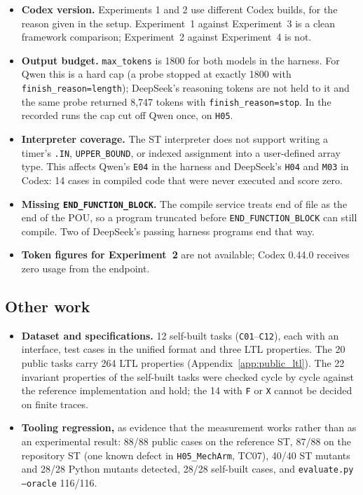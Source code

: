 \begin{itemize}
\item \textbf{Codex version.} Experiments 1 and 2 use different Codex builds,
      for the reason given in the setup. Experiment~1 against Experiment~3 is a
      clean framework comparison; Experiment~2 against Experiment~4 is not.
\item \textbf{Output budget.} \texttt{max\_tokens} is 1800 for both models in
      the harness. For Qwen this is a hard cap (a probe stopped at exactly 1800
      with \texttt{finish\_reason=length}); DeepSeek's reasoning tokens are not
      held to it and the same probe returned 8{,}747 tokens with
      \texttt{finish\_reason=stop}. In the recorded runs the cap cut off Qwen
      once, on \texttt{H05}.
\item \textbf{Interpreter coverage.} The ST interpreter does not support
      writing a timer's \texttt{.IN}, \texttt{UPPER\_BOUND}, or indexed assignment
      into a user-defined array type. This affects Qwen's \texttt{E04} in the
      harness and DeepSeek's \texttt{H04} and \texttt{M03} in Codex: 14 cases
      in compiled code that were never executed and score zero.
\item \textbf{Missing \texttt{END\_FUNCTION\_BLOCK}.} The compile service
      treats end of file as the end of the POU, so a program truncated before
      \texttt{END\_FUNCTION\_BLOCK} can still compile. Two of DeepSeek's passing
      harness programs end that way.
\item \textbf{Token figures for Experiment~2} are not available; Codex 0.44.0
      receives zero usage from the endpoint.
\end{itemize}

\subsection{Other work}

\begin{itemize}
\item \textbf{Dataset and specifications.} 12 self-built tasks
      (\texttt{C01}--\texttt{C12}), each with an interface, test cases in the
      unified format and three LTL properties. The 20 public tasks carry 264
      LTL properties (Appendix~\ref{app:public_ltl}). The 22 invariant
      properties of the self-built tasks were checked cycle by cycle against
      the reference implementation and hold; the 14 with \texttt{F} or
      \texttt{X} cannot be decided on finite traces.
\item \textbf{Tooling regression,} as evidence that the measurement works
      rather than as an experimental result: 88/88 public cases on the
      reference ST, 87/88 on the repository ST (one known defect in
      \texttt{H05\_MechArm}, TC07), 40/40 ST mutants and 28/28 Python mutants
      detected, 28/28 self-built cases, and \texttt{evaluate.py --oracle}
      116/116.
\end{itemize}

